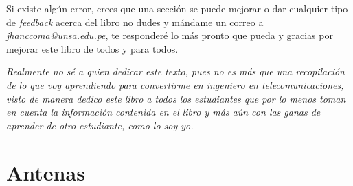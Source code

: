\documentclass[
	12pt, %
	fleqn, %
	a4paper, %
	oneside, %
]{LegrandOrangeBook}
\begin{document}
\noindent Si existe algún error, crees que una sección se puede mejorar o dar cualquier tipo de \textit{feedback} acerca del libro no dudes y mándame un correo a \textit{jhanccoma@unsa.edu.pe}, te responderé lo más pronto que pueda y gracias por mejorar este libro de todos y para todos.
\clearpage
\begin{center}
    \thispagestyle{empty}
    \vspace*{\fill}
    \textit{Realmente no sé a quien dedicar este texto, pues no es más que una recopilación de lo que voy aprendiendo para convertirme en ingeniero en telecomunicaciones, visto de manera dedico este libro a todos los estudiantes que por lo menos toman en cuenta la información contenida en el libro y más aún con las ganas de aprender de otro estudiante, como lo soy yo.}
    \vspace*{\fill}
\end{center}
\clearpage



\pagestyle{empty} %

\tableofcontents %

\cleardoublepage %

\pagestyle{fancy} %

\part{Antenas}
\end{document}

